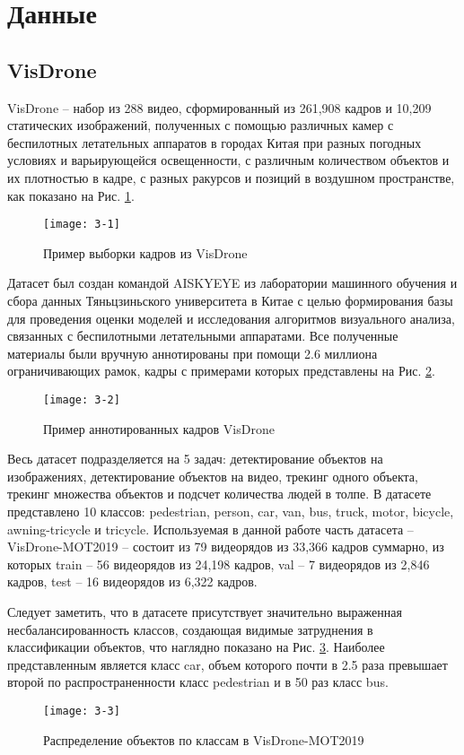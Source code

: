 \section{Данные}

\subsection{VisDrone}

VisDrone -- набор из 288 видео, сформированный из 261,908 кадров и 10,209 статических изображений, полученных с помощью различных камер с беспилотных летательных аппаратов в городах Китая при разных погодных условиях и варьирующейся освещенности, с различным количеством объектов и их плотностью в кадре, с разных ракурсов и позиций в воздушном пространстве, как показано на Рис. \ref{img:3-1}.

\vspace{0.5cm}

\begin{figure}[ht]
    \centering
    \texttt{[image: 3-1]}
    \caption{Пример выборки кадров из VisDrone}
    \label{img:3-1}
\end{figure}

Датасет был создан командой AISKYEYE из лаборатории машинного обучения и сбора данных Тяньцзиньского университета в Китае с целью формирования базы для проведения оценки моделей и исследования алгоритмов визуального анализа, связанных с беспилотными летательными аппаратами. Все полученные материалы были вручную аннотированы при помощи 2.6 миллиона ограничивающих рамок, кадры с примерами которых представлены на Рис. \ref{img:3-2}.

\begin{figure}[ht]
    \centering
    \texttt{[image: 3-2]}
    \caption{Пример аннотированных кадров VisDrone}
    \label{img:3-2}
\end{figure}

Весь датасет подразделяется на 5 задач: детектирование объектов на изображениях, детектирование объектов на видео, трекинг одного объекта, трекинг множества объектов и подсчет количества людей в толпе. В датасете представлено 10 классов: pedestrian, person, car, van, bus, truck, motor, bicycle, awning-tricycle и tricycle.
Используемая в данной работе часть датасета -- VisDrone-MOT2019 -- состоит из 79 видеорядов из 33,366 кадров суммарно, из которых train -- 56 видеорядов из 24,198 кадров, val -- 7 видеорядов из 2,846 кадров, test -- 16 видеорядов из 6,322 кадров.

Следует заметить, что в датасете присутствует значительно выраженная несбалансированность классов, создающая видимые затруднения в классификации объектов, что наглядно показано на Рис. \ref{img:3-3}. Наиболее представленным является класс car, объем которого почти в 2.5 раза превышает второй по распространенности класс pedestrian и в 50 раз класс bus.

\begin{figure}[ht]
    \centering
    \texttt{[image: 3-3]}
    \caption{Распределение объектов по классам в VisDrone-MOT2019}
    \label{img:3-3}
\end{figure}
